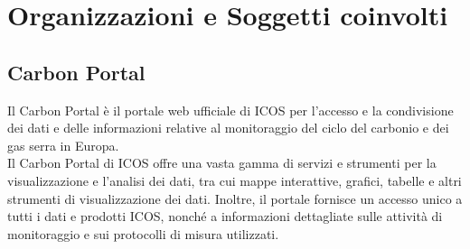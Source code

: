 \chapter{Organizzazioni e Soggetti coinvolti}
\label{chap:soggetti}

\section{Carbon Portal}
\label{section:carbonportal}
Il Carbon Portal è il portale web ufficiale di ICOS 
per l'accesso e la condivisione dei dati e delle
informazioni relative al monitoraggio
del ciclo del carbonio e dei gas serra in Europa.\\

Il Carbon Portal di ICOS offre una vasta gamma di servizi e
strumenti per la visualizzazione e l'analisi dei dati,
tra cui mappe interattive, grafici, tabelle e altri strumenti
di visualizzazione dei dati.
Inoltre, il portale fornisce un accesso unico a tutti i
dati e prodotti ICOS,
nonché a informazioni dettagliate sulle attività di
monitoraggio e sui protocolli di misura utilizzati.\\

